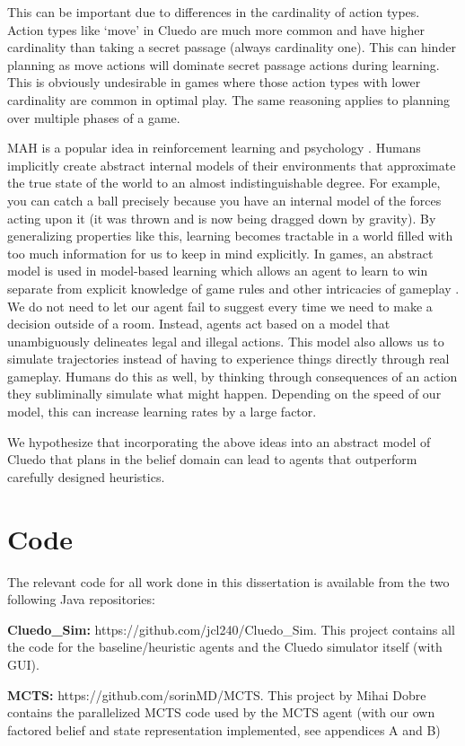 \documentclass[msc, deptreport, ai, romanprepages]{infthesis}
\begin{document}
This can be important due to differences in the cardinality of action types. Action types like `move' in Cluedo are much more common and have higher cardinality than taking a secret passage (always cardinality one). This can hinder planning as move actions will dominate secret passage actions during learning. This is obviously undesirable in games where those action types with lower cardinality are common in optimal play. The same reasoning applies to planning over multiple phases of a game.

MAH is a popular idea in reinforcement learning and psychology \cite{Sutton-barto} \cite{Mihai}. Humans implicitly create abstract internal models of their environments that approximate the true state of the world to an almost indistinguishable degree. For example, you can catch a ball precisely because you have an internal model of the forces acting upon it (it was thrown and is now being dragged down by gravity). By generalizing properties like this, learning becomes tractable in a world filled with too much information for us to keep in mind explicitly. In games, an abstract model is used in model-based learning which allows an agent to learn to win separate from explicit knowledge of game rules and other intricacies of gameplay \cite{Sutton-barto}. We do not need to let our agent fail to suggest every time we need to make a decision outside of a room. Instead, agents act based on a model that unambiguously delineates legal and illegal actions. This model also allows us to simulate trajectories instead of having to experience things directly through real gameplay. Humans do this as well, by thinking through consequences of an action they subliminally simulate what might happen. Depending on the speed of our model, this can increase learning rates by a large factor. 

We hypothesize that incorporating the above ideas into an abstract model of Cluedo that plans in the belief domain can lead to agents that outperform carefully designed heuristics.

\section{Code}
The relevant code for all work done in this dissertation is available from the two following Java repositories:
\begin{description}
\item \textbf{Cluedo\_Sim:} https://github.com/jcl240/Cluedo\_Sim. This project contains all the code for the baseline/heuristic agents and the Cluedo simulator itself (with GUI). 
\item \textbf{MCTS:} https://github.com/sorinMD/MCTS. This project by Mihai Dobre contains the parallelized MCTS code used by the MCTS agent (with our own factored belief and state representation implemented, see appendices A and B)
\end{description}
\end{document}
